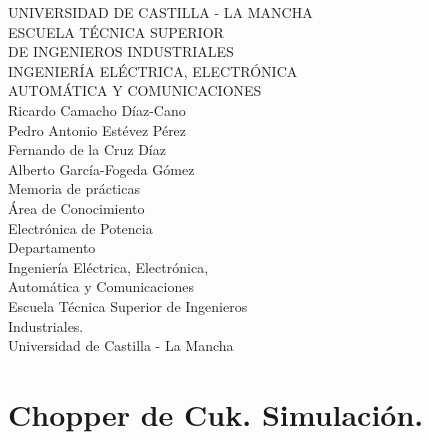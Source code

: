 \documentclass[10pt]{article}
\begin{document}
	\begin{titlepage}
		\begin{center}
			\fontsize{13pt}{15pt}
			{\selectfont UNIVERSIDAD DE CASTILLA - LA MANCHA} \\
			\bigskip
			\smallskip
			{\selectfont ESCUELA TÉCNICA SUPERIOR \\ \smallskip
				DE INGENIEROS INDUSTRIALES}	\\	
			\bigskip
			\medskip
			{\selectfont INGENIERÍA ELÉCTRICA, ELECTRÓNICA}\\ \smallskip
			{\selectfont AUTOMÁTICA Y COMUNICACIONES}\\
			\bigskip
			\bigskip
			\bigskip
			\bigskip
			\fontsize{15pt}{17pt}
			{\selectfont Ricardo Camacho Díaz-Cano} \\ \medskip
			{\selectfont Pedro Antonio Estévez Pérez} \\ \medskip
			{\selectfont Fernando de la Cruz Díaz} \\ \medskip
			{\selectfont Alberto García-Fogeda Gómez} \\ \medskip
			\bigskip
			\bigskip
			\bigskip
			\bigskip
			\bigskip
			\bigskip
			\fontsize{20pt}{22pt}
			\textrm{ Memoria de prácticas } \\ \bigskip
			\bigskip
			\bigskip
			\bigskip
			\bigskip
			\bigskip
			\bigskip
			\fontsize{15pt}{17}
			\textrm{Área de Conocimiento}\\ \smallskip \smallskip
			\fontsize{15pt}{17}
			\textrm{Electrónica de Potencia}\\ \bigskip
			\fontsize{15pt}{17}
			\textrm{Departamento}\\ \smallskip \smallskip
			\fontsize{15pt}{17}
			\textrm{Ingeniería Eléctrica, Electrónica,}\\ \smallskip
			\textrm{Automática y Comunicaciones}\\ \smallskip \smallskip
			\textrm{Escuela Técnica Superior de Ingenieros\\ \smallskip Industriales.}\\ \smallskip \smallskip \smallskip
			\textrm{Universidad de Castilla - La Mancha}	    
		\end{center}
	\end{titlepage}
	\tableofcontents
	\listoffigures
	\newpage
	
	\section{Chopper de Cuk. Simulación.}
	
\end{document}
